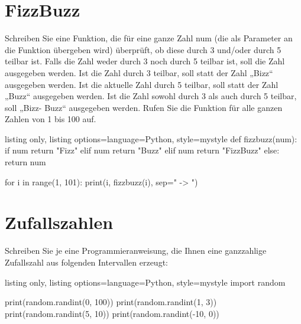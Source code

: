 \documentclass[11pt, oneside]{book}
\begin{document}
\section{FizzBuzz}
Schreiben Sie eine Funktion, die f\"ur eine ganze Zahl num (die als Parameter an die Funktion \"ubergeben wird) \"uberpr\"uft, ob diese durch 3 und/oder durch 5 teilbar ist. Falls die Zahl weder durch 3 noch durch 5 teilbar ist, soll die Zahl ausgegeben werden. Ist die Zahl durch 3 teilbar, soll statt der Zahl „Bizz“ ausgegeben werden. Ist die aktuelle Zahl durch 5 teilbar, soll statt der Zahl „Buzz“ ausgegeben werden. Ist die Zahl sowohl durch 3 als auch durch 5 teilbar, soll „Bizz- Buzz“ ausgegeben werden. Rufen Sie die Funktion f\"ur alle ganzen Zahlen von 1 bis 100 auf.
\begin{tcblisting}{listing only, listing options={language=Python, style=mystyle}}
def fizzbuzz(num):
    if num %
        return "Fizz"
    elif num %
        return "Buzz"
    elif num %
        return "FizzBuzz"
    else:
        return num
    
for i in range(1, 101):
    print(i, fizzbuzz(i), sep=" -> ")
\end{tcblisting}


\section{Zufallszahlen}
Schreiben Sie je eine Programmieranweisung, die Ihnen eine ganzzahlige Zufallszahl aus folgenden Intervallen erzeugt:
\begin{tcblisting}{listing only, listing options={language=Python, style=mystyle}}
import random

print(random.randint(0, 100))
print(random.randint(1, 3))
print(random.randint(5, 10))
print(random.randint(-10, 0))
\end{tcblisting}
\end{document}
